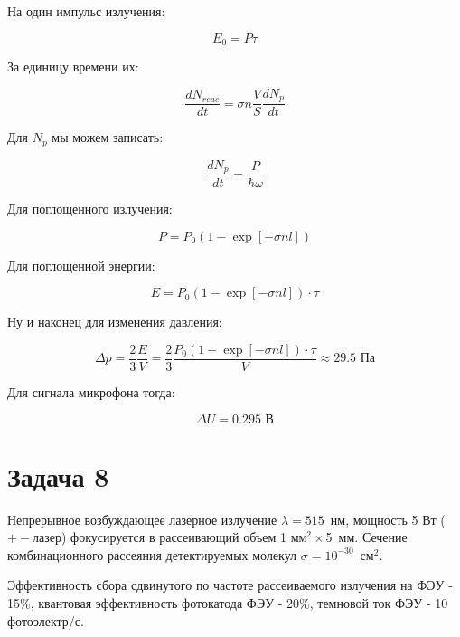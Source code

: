 \documentclass[a4paper, 12pt]{article}
\begin{document}
На один импульс излучения:

\begin{equation}
	E_0 = P \tau
\end{equation}

За единицу времени их:

\begin{equation}
	\frac{dN_{reac}}{dt} = \sigma n \frac{V}{S} \frac{d N_p}{dt} 
\end{equation}

Для $N_p$ мы можем записать:

\begin{equation}
	\frac{d N_p}{dt} = \frac{P}{\hbar \omega}
\end{equation}

Для поглощенного излучения:

\begin{equation}
	P = P_0 (1 - \exp [-\sigma n l])
\end{equation}

Для поглощенной энергии:

\begin{equation}
	E = P_0 (1 - \exp [-\sigma n l]) \cdot \tau
\end{equation}

Ну и наконец для изменения давления:

\begin{equation}
	\Delta p = \frac{2}{3} \frac{E}{V} = \frac{2}{3} \frac{P_0 (1 - \exp [-\sigma n l]) \cdot \tau}{V} \approx 29.5 \text{ Па}
\end{equation}

Для сигнала микрофона тогда:

\begin{equation}
	\Delta U = 0.295 \text{ В}
\end{equation}

\section*{Задача 8}

Непрерывное возбуждающее лазерное излучение $\lambda = 515$~нм, мощность 5 Вт ($+-$лазер) фокусируется в рассеивающий объем 1 мм$^2 \times$5~мм. Сечение комбинационного рассеяния детектируемых молекул $\sigma = 10^{-30}$~см$^2$.

Эффективность сбора сдвинутого по частоте рассеиваемого излучения на ФЭУ - 15\%, квантовая эффективность фотокатода ФЭУ - 20\%, темновой ток ФЭУ - 10 фотоэлектр/с.
\end{document}
